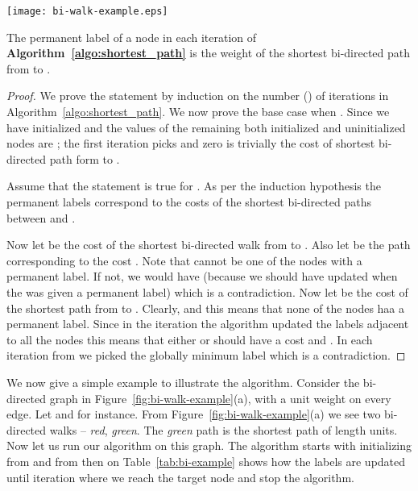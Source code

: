 \documentclass[runningheads]{llncs}
\begin{document}
\begin{figure*}
\label{fig:bi-walk-example}
\begin{center}
\texttt{[image: bi-walk-example.eps]}
\end{center}
\caption{{\bf(a)} node  contains two bi-directed walks from node , the green colored path is the shortest.{\bf (b)} the walk starting from node  and ending at node  is a Chinese walk but not a cyclic Chinese walk.}
\end{figure*}

\begin{theorem}
The permanent label of a node  in each iteration of {\bf Algorithm~\ref{algo:shortest_path}} is the weight of the
shortest bi-directed path from  to .
\end{theorem}
\begin{proof}
We prove the statement by induction on the number () of iterations in 
Algorithm~\ref{algo:shortest_path}. We now prove the base case when . Since
we have initialized  and the values of the remaining
both initialized and uninitialized nodes are ; the first iteration picks  and zero
is trivially the cost of shortest bi-directed path form  to . 

Assume that the statement is true for . As per the induction hypothesis the permanent labels 
 correspond to the costs of the shortest 
bi-directed paths between  and . 

Now let 
be the cost of the shortest bi-directed walk from  to . Also let 
 be the path corresponding to the cost .
Note that  cannot be one of the nodes with a permanent label. 
If not, we would have  
(because we should have updated  when the  was given a permanent label) which is a contradiction. 
Now let  be the cost of the shortest path from  to . Clearly, 
 and this means that none of the nodes  haa a permanent label. Since in the iteration  the algorithm updated the labels adjacent to
all the nodes this means that either  or  should have a cost 
and . In each iteration from  we picked the globally 
minimum label  which is a contradiction. 

\end{proof}

We now give a simple example to illustrate the algorithm. Consider the bi-directed graph in 
Figure~\ref{fig:bi-walk-example}(a), with a unit weight on every edge. Let  and  for instance. 
From Figure~\ref{fig:bi-walk-example}(a) we see two bi-directed walks -- {\em red}, {\em green}.
The {\em green} path is the shortest path of length  units. Now let us run our algorithm on this
graph. The algorithm starts with initializing from  and from then on Table~\ref{tab:bi-example}
shows how the  labels are updated until iteration  where we reach the target node  and stop
the algorithm.
\end{document}
